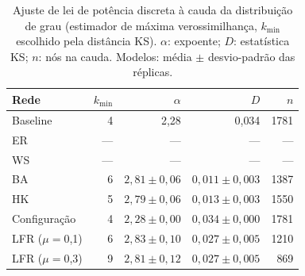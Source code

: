\begin{table}[htbp]
\centering
\footnotesize
\caption{Ajuste de lei de potência discreta à cauda da distribuição de grau (estimador de máxima verossimilhança, $k_{\min}$ escolhido pela distância KS). $\alpha$: expoente; $D$: estatística KS; $n$: nós na cauda. Modelos: média $\pm$ desvio-padrão das réplicas.}
\label{tab:ajuste_pl}
\begin{tabular}{lrrrr}
\toprule
\textbf{Rede} & $k_{\min}$ & $\alpha$ & $D$ & $n$ \\
\midrule
Baseline & 4 & 2{,}28 & 0{,}034 & 1781 \\
ER & --- & --- & --- & --- \\
WS & --- & --- & --- & --- \\
BA & 6 & $2{,}81 \pm 0{,}06$ & $0{,}011 \pm 0{,}003$ & 1387 \\
HK & 5 & $2{,}79 \pm 0{,}06$ & $0{,}013 \pm 0{,}003$ & 1550 \\
Configuração & 4 & $2{,}28 \pm 0{,}00$ & $0{,}034 \pm 0{,}000$ & 1781 \\
LFR ($\mu{=}$0,1) & 6 & $2{,}83 \pm 0{,}10$ & $0{,}027 \pm 0{,}005$ & 1210 \\
LFR ($\mu{=}$0,3) & 9 & $2{,}81 \pm 0{,}12$ & $0{,}027 \pm 0{,}005$ & 869 \\
\bottomrule
\end{tabular}
\end{table}
